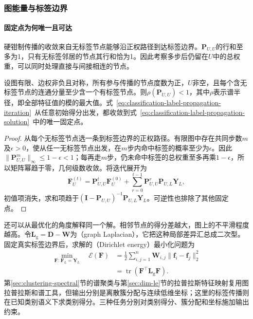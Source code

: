 \subsubsection{图能量与标签边界}
\label{sec:classification-label-propagation-analysis}

\paragraph{固定点为何唯一且可达}
硬钳制传播的收敛来自无标签节点能够沿正权路径到达标签边界。$\bm{P}_{U,U}$的行和至多为1，只有无标签邻居的节点其行和恰为1。因此考察多步后仍留在$U$中的总权重，可以同时处理直接与间接相连的节点。

\begin{theorem}[标签传播在各连通分量有标签条件下解的唯一性]
  \label{thm:classification-label-propagation-convergence}
  设图有限、边权非负且对称，所有参与传播的节点度数为正，$U$非空，且每个含无标签节点的连通分量至少含一个有标签节点。则$\rho(\bm{P}_{U,U})<1$，其中$\rho$表示谱半径，即全部特征值的模的最大值。式~\eqref{eq:classification-label-propagation-iteration}~从任意初始得分出发，都收敛到式~\eqref{eq:classification-label-propagation-solution}~中的唯一固定点。
\end{theorem}

\begin{proof}
从每个无标签节点选一条到标签边界的正权路径。有限图中存在共同步数$m$及$\epsilon>0$，使从任一无标签节点出发，在$m$步内命中标签的概率至少为$\epsilon$。因此$\|\bm P_{U,U}^{m}\|_\infty\leq1-\epsilon<1$；每再走$m$步，仍未命中标签的总权重至多再乘$1-\epsilon$，所以矩阵幂趋于零，几何级数收敛。将迭代展开为
\[
  \bm F_U^{(t)}=\bm P_{U,U}^{t}\bm F_U^{(0)}
    +\sum_{r=0}^{t-1}\bm P_{U,U}^{r}\bm P_{U,L}\bm Y_L,
\]
初值项消失，求和项趋于$(\bm I-\bm P_{U,U})^{-1}\bm P_{U,L}\bm Y_L$。可逆性也排除了其他固定点。
\end{proof}

还可以从最优化的角度解释同一个解。相邻节点的得分差越大，图上的不平滑程度越高。令$\bm{L}_{\mathrm{g}}=\bm{D}-\bm{W}$为（graph Laplacian），它把这种局部差异汇总成二次型。固定真实标签边界后，求解的（Dirichlet energy）最小化问题为
\begin{equation}
  \label{eq:classification-label-propagation-energy}
  \begin{aligned}
    \min_{\bm{F}:\,\bm{F}_L=\bm{Y}_L}\quad
    \mathcal{E}(\bm{F})
      &=\frac12\sum_{i,j=1}^{n}
        \bm{W}_{i,j}\lVert\bm{f}_i-\bm{f}_j\rVert_2^2\\
      &=\operatorname{tr}
        (\bm{F}^{\top}\bm{L}_{\mathrm{g}}\bm{F}).
  \end{aligned}
\end{equation}
第\ref{sec:clustering-spectral}节的谱聚类与第\ref{sec:dim-le}节的拉普拉斯特征映射复用图拉普拉斯和谱工具，但输出分别是离散簇分配与连续低维坐标；这里的标签传播则在已知类别语义下求类别得分。三种任务分别对类别得分、簇分配和坐标施加输出约束。

